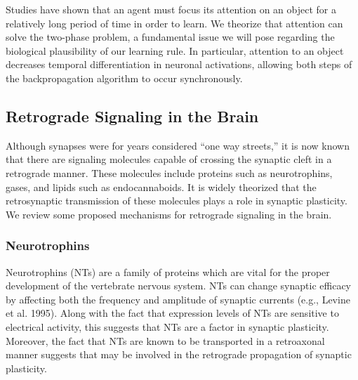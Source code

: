 \documentclass[12pt]{article}
\begin{document}
Studies have shown that an agent must focus its attention on an object for a relatively long period of time in order to learn. \cite{Desimone2014} We theorize that attention can solve the two-phase problem, a fundamental issue we will pose regarding the biological plausibility of our learning rule. In particular, attention to an object decreases temporal differentiation in neuronal activations, allowing both steps of the backpropagation algorithm to occur synchronously.

\subsection{Retrograde Signaling in the Brain}
Although synapses were for years considered ``one way streets,'' it is now known that there are signaling molecules capable of crossing the synaptic cleft in a retrograde manner. \cite{Tao2001} These molecules include proteins such as neurotrophins, \cite{Dechant2003} gases, \cite{RodriguezGrande2017} and lipids such as endocannaboids. \cite{Mechoulam1998} It is widely theorized that the retrosynaptic transmission of these molecules plays a role in synaptic plasticity. \cite{EAlger2002}\cite{Schuman1999} We review some proposed mechanisms for retrograde signaling in the brain.

\subsubsection{Neurotrophins}
Neurotrophins (NTs) are a family of proteins which are vital for the proper development of the vertebrate nervous system. \cite{Tao2001} NTs can change synaptic efficacy by affecting both the frequency and amplitude of synaptic currents (e.g., Levine et al. 1995). Along with the fact that expression levels of NTs are sensitive to electrical activity, this suggests that NTs are a factor in synaptic plasticity. Moreover, the fact that NTs are known to be transported in a retroaxonal manner \cite{Hendry1974} suggests that may be involved in the retrograde propagation of synaptic plasticity.
\end{document}
